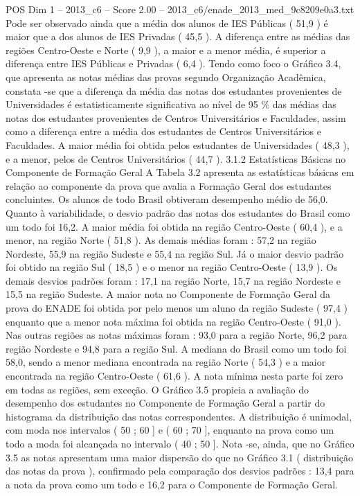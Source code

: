 \begin{textsample}{POS Dim 1 – 2013\_c6 – Score 2.00 – 2013\_c6/enade\_2013\_med\_9c8209e0a3.txt}
Pode ser observado ainda que a média dos alunos de IES Públicas ( 51,9 ) é maior que a dos alunos de IES Privadas ( 45,5 ).
A diferença entre as médias das regiões Centro-Oeste e Norte ( 9,9 ), a maior e a menor média, é superior a diferença entre IES Públicas e Privadas ( 6,4 ).
Tendo como foco o Gráfico 3.4, que apresenta as notas médias das provas segundo Organização Acadêmica, constata -se que a diferença da média das notas dos estudantes provenientes de Universidades é estatisticamente significativa ao nível de 95 \% das médias das notas dos estudantes provenientes de Centros Universitários e Faculdades, assim como a diferença entre a média dos estudantes de Centros Universitários e Faculdades.
A maior média foi obtida pelos estudantes de Universidades ( 48,3 ), e a menor, pelos de Centros Universitários ( 44,7 ). 3.1.2 Estatísticas Básicas no Componente de Formação Geral A Tabela 3.2 apresenta as estatísticas básicas em relação ao componente da prova que avalia a Formação Geral dos estudantes concluintes.
Os alunos de todo Brasil obtiveram desempenho médio de 56,0.
Quanto à variabilidade, o desvio padrão das notas dos estudantes do Brasil como um todo foi 16,2.
A maior média foi obtida na região Centro-Oeste ( 60,4 ), e a menor, na região Norte ( 51,8 ).
As demais médias foram : 57,2 na região Nordeste, 55,9 na região Sudeste e 55,4 na região Sul.
Já o maior desvio padrão foi obtido na região Sul ( 18,5 ) e o menor na região Centro-Oeste ( 13,9 ).
Os demais desvios padrões foram : 17,1 na região Norte, 15,7 na região Nordeste e 15,5 na região Sudeste.
A maior nota no Componente de Formação Geral da prova do ENADE foi obtida por pelo menos um aluno da região Sudeste ( 97,4 ) enquanto que a menor nota máxima foi obtida na região Centro-Oeste ( 91,0 ).
Nas outras regiões as notas máximas foram : 93,0 para a região Norte, 96,2 para região Nordeste e 94,8 para a região Sul.
A mediana do Brasil como um todo foi 58,0, sendo a menor mediana encontrada na região Norte ( 54,3 ) e a maior encontrada na região Centro-Oeste ( 61,6 ).
A nota mínima nesta parte foi zero em todas as regiões, sem exceção.
O Gráfico 3.5 propicia a avaliação do desempenho dos estudantes no Componente de Formação Geral a partir do histograma da distribuição das notas correspondentes.
A distribuição é unimodal, com moda nos intervalos ( 50 ; 60 ] e ( 60 ; 70 ], enquanto na prova como um todo a moda foi alcançada no intervalo ( 40 ; 50 ].
Nota -se, ainda, que no Gráfico 3.5 as notas apresentam uma maior dispersão do que no Gráfico 3.1 ( distribuição das notas da prova ), confirmado pela comparação dos desvios padrões : 13,4 para a nota da prova como um todo e 16,2 para o Componente de Formação Geral.

\end{textsample}
